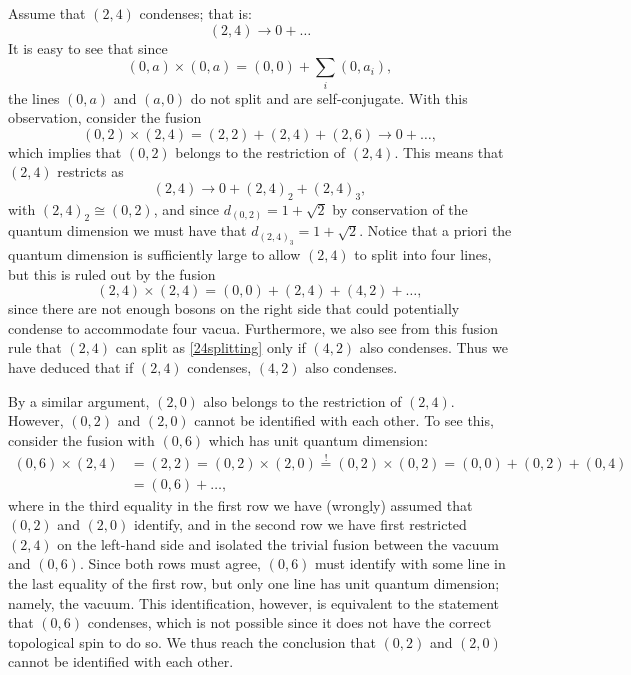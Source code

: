 \documentclass[11pt]{article}
\numberwithin{equation}{section}
\begin{document}
Assume that $(2,4)$ condenses; that is:
\begin{equation}
    (2,4) \longrightarrow 0 + \ldots
\end{equation}
It is easy to see that since
\begin{equation}
    (0,a) \times (0,a) = (0,0) + \sum_{i} (0,a_{i}),
\end{equation}
the lines $(0,a)$ and $(a,0)$ do not split and are self-conjugate. With this observation, consider the fusion
\begin{equation}
    (0,2) \times (2,4) = (2,2) + (2,4) + (2,6) \longrightarrow 0 + \ldots,
\end{equation}
which implies that $(0,2)$ belongs to the restriction of $(2,4)$. This means that $(2,4)$ restricts as
\begin{equation} \label{24splitting}
    (2,4) \longrightarrow 0 + (2,4)_{2} + (2,4)_{3},
\end{equation}
with $(2,4)_{2} \cong (0,2)$, and since $d_{(0,2)} = 1 + \sqrt{2}$ by conservation of the quantum dimension we must have that $d_{(2,4)_{3}} = 1 + \sqrt{2}$. Notice that a priori the quantum dimension is sufficiently large to allow $(2,4)$ to split into four lines, but this is ruled out by the fusion
\begin{equation}
    (2,4) \times (2,4) = (0,0) + (2,4) + (4,2) + \ldots,
\end{equation}
since there are not enough bosons on the right side that could potentially condense to accommodate four vacua. Furthermore, we also see from this fusion rule that $(2,4)$ can split as \eqref{24splitting} only if $(4,2)$ also condenses. Thus we have deduced that if $(2,4)$ condenses, $(4,2)$ also condenses.

By a similar argument, $(2,0)$ also belongs to the restriction of $(2,4)$. However, $(0,2)$ and $(2,0)$ cannot be identified with each other. To see this, consider the fusion with $(0,6)$ which has unit quantum dimension:
\begin{align}
    (0,6) \times (2,4) &= (2,2) = (0,2) \times (2,0) \overset{!}{=} (0,2) \times (0,2) = (0,0) + (0,2) + (0,4)  \\[0.3cm] &= (0,6) + \ldots,
\end{align}
where in the third equality in the first row we have (wrongly) assumed that $(0,2)$ and $(2,0)$ identify, and in the second row we have first restricted $(2,4)$ on the left-hand side and isolated the trivial fusion between the vacuum and $(0,6)$. Since both rows must agree, $(0,6)$ must identify with some line in the last equality of the first row, but only one line has unit quantum dimension; namely, the vacuum. This identification, however, is equivalent to the statement that $(0,6)$ condenses, which is not possible since it does not have the correct topological spin to do so. We thus reach the conclusion that $(0,2)$ and $(2,0)$ cannot be identified with each other.
\end{document}

